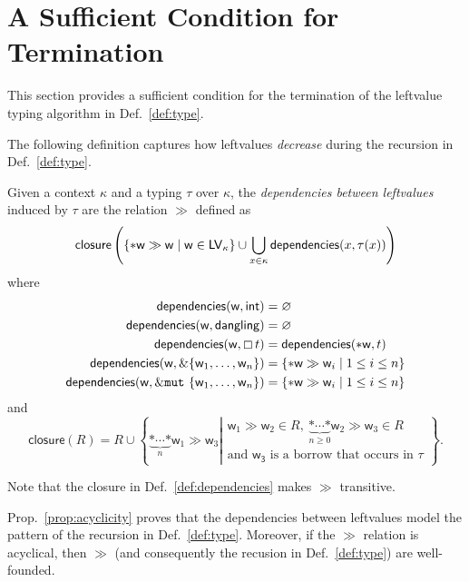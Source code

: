 \section{A Sufficient Condition for Termination}\label{sec:termination}

This section provides a sufficient condition for the termination of the
leftvalue typing algorithm in Def.~\ref{def:type}.

The following definition captures how leftvalues \emph{decrease}
during the recursion in Def.~\ref{def:type}.

\begin{definition}\label{def:dependencies}
  Given a context $\kappa$ and a typing $\tau$ over $\kappa$, the \emph{dependencies between leftvalues}
  induced by $\tau$ are the relation $\gg$ defined as
  \[
  \mathsf{closure}\left(\{\mathtt{*}\mathsf{w}\gg\mathsf{w}\mid\mathsf{w}\in\mathsf{LV}_\kappa\}
  \cup\bigcup\limits_{x\in\kappa}\mathsf{dependencies}(x,\tau(x))\right)
  \]
  where
  \begin{align*}
    \mathsf{dependencies}(\mathsf{w},\mathsf{int})&=\varnothing\\
    \mathsf{dependencies}(\mathsf{w},\mathsf{dangling})&=\varnothing\\
    \mathsf{dependencies}(\mathsf{w},\boxempty\,{t})&=\mathsf{dependencies}(\mathtt{*}\mathsf{w},t)\\
    \mathsf{dependencies}(\mathsf{w},\&\{\mathsf{w}_1,\ldots,\mathsf{w}_n\})&=\{\mathtt{*}\mathsf{w}\gg\mathsf{w}_i\mid 1\le i\le n\}\\
    \mathsf{dependencies}(\mathsf{w},\&\mathtt{mut}\ \{\mathsf{w}_1,\ldots,\mathsf{w}_n\})&=\{\mathtt{*}\mathsf{w}\gg\mathsf{w}_i\mid 1\le i\le n\}
  \end{align*}
  and
  \[
  \mathsf{closure}(R)=R\cup\left\{\underbrace{\mathtt{*}\cdots\mathtt{*}}_{n}\mathsf{w}_1\gg\mathsf{w}_3\left|
  \begin{array}{l}
    \mathsf{w}_1\gg\mathsf{w}_2\in R,\ \underbrace{\mathtt{*}\cdots\mathtt{*}}_{n\ge 0}\mathsf{w}_2\gg\mathsf{w}_3\in R\\
    \text{and $\mathsf{w_3}$ is a borrow that occurs in $\tau$}
  \end{array}\right.\right\}.
  \]
\end{definition}

\noindent
Note that the closure in Def.~\ref{def:dependencies} makes $\gg$ transitive.

Prop.~\ref{prop:acyclicity} proves that the dependencies between leftvalues
model the pattern of the recursion in Def.~\ref{def:type}. Moreover,
if the $\gg$ relation is acyclical, then $\gg$ (and consequently the recusion
in Def.~\ref{def:type}) are well-founded.

